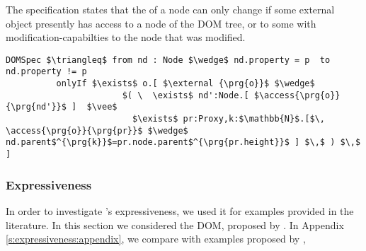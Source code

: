 The specification  states that the  of a node can only change if
some external object presently has 
access to a node of the DOM tree, or to some  with modification-capabilties
to the node that was modified.
\begin{lstlisting}[language = Chainmail, mathescape=true, frame=lines]
DOMSpec $\triangleq$ from nd : Node $\wedge$ nd.property = p  to nd.property != p
          onlyIf $\exists$ o.[ $\external {\prg{o}}$ $\wedge$ 
                       $( \  \exists$ nd':Node.[ $\access{\prg{o}}{\prg{nd'}}$ ]  $\vee$ 
                         $\exists$ pr:Proxy,k:$\mathbb{N}$.[$\, \access{\prg{o}}{\prg{pr}}$ $\wedge$ nd.parent$^{\prg{k}}$=pr.node.parent$^{\prg{pr.height}}$ ] $\,$ ) $\,$ ]
\end{lstlisting}

\subsubsection{Expressiveness}
In order to investigate \Nec's expressiveness,  
we used it for
examples provided in the literature. In this section we considered the DOM, %
proposed by  \citeauthor{dd}. In Appendix \ref{s:expressiveness:appendix},
we compare with examples proposed by  \citeauthor{FASE}, 
 

